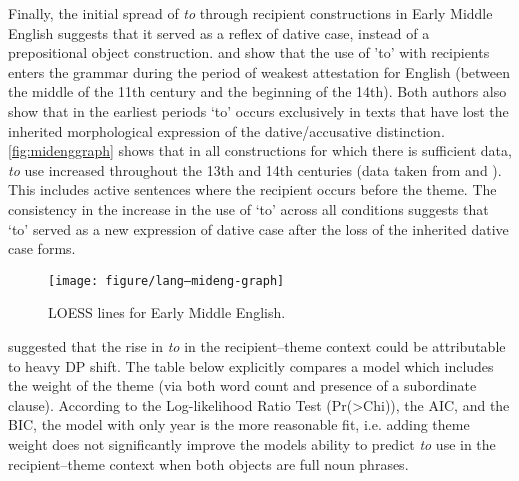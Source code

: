 Finally, the initial spread of \emph{to} through recipient constructions in Early Middle English suggests that it served as a reflex of dative case, instead of a prepositional object construction. \cite{McFadden.2002} and \cite{Polo.2002} show that the use of 'to' with recipients enters the grammar during the period of weakest attestation for English (between the middle of the 11th century and the beginning of the 14th). Both authors also show that in the earliest periods `to' occurs exclusively in texts that have lost the inherited morphological expression of the dative/accusative distinction. \autoref{fig:midenggraph} shows that in all constructions for which there is sufficient data, \emph{to} use increased throughout the 13th and 14th centuries (data taken from \cite{Kroch.2000} and \cite{Taylor.2006}). This includes active sentences where the recipient occurs before the theme. The consistency in the increase in the use of `to' across all conditions suggests that `to' served as a new expression of dative case after the loss of the inherited dative case forms.

\begin{knitrout}
\color{fgcolor}\begin{figure}[p!]


{\centering \texttt{[image: figure/lang--mideng-graph]} 

}

\caption[LOESS lines for Early Middle English]{LOESS lines for Early Middle English.\label{fig:midenggraph}\label{fig:mideng-graph}}
\end{figure}


\end{knitrout}





\cite{McFadden.2002} suggested that the rise in \emph{to} in the recipient--theme context could be attributable to heavy DP shift. The table below explicitly compares a model which includes the weight of the theme (via both word count and presence of a subordinate clause). According to the Log-likelihood Ratio Test (Pr(>Chi)), the AIC, and the BIC, the model with only year is the more reasonable fit, i.e. adding theme weight does not significantly improve the models ability to predict \emph{to} use in the recipient--theme context when both objects are full noun phrases.

